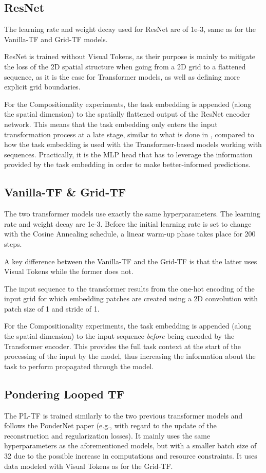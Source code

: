 \subsection{ResNet}
\label{sec:resnet_training_details_appendix}
The learning rate and weight decay used for ResNet are of 1e-3, same as for the Vanilla-TF and Grid-TF models.

ResNet is trained without Visual Tokens, as their purpose is mainly to mitigate the loss of the 2D spatial structure when going from a 2D grid to a flattened sequence, as it is the case for Transformer models, as well as defining more explicit grid boundaries.

For the Compositionality experiments, the task embedding is appended (along the spatial dimension) to the spatially flattened output of the ResNet encoder network. This means that the task embedding only enters the input transformation process at a late stage, similar to what is done in \citep{cvr2022}, compared to how the task embedding is used with the Transformer-based models working with sequences. Practically, it is the MLP head that has to leverage the information provided by the task embedding in order to make better-informed predictions.

\subsection{Vanilla-TF \& Grid-TF} \label{sec:vit_training_details_appendix}
The two transformer models use exactly the same hyperparameters. The learning rate and weight decay are 1e-3. Before the initial learning rate is set to change with the Cosine Annealing schedule, a linear warm-up phase takes place for 200 steps.

A key difference between the Vanilla-TF and the Grid-TF is that the latter uses Visual Tokens while the former does not.

The input sequence to the transformer results from the one-hot encoding of the input grid for which embedding patches are created using a 2D convolution with patch size of 1 and stride of 1.

For the Compositionality experiments, the task embedding is appended (along the spatial dimension) to the input sequence \textit{before} being encoded by the Transformer encoder. This provides the full task context at the start of the processing of the input by the model, thus increasing the information about the task to perform propagated through the model.


\subsection{Pondering Looped TF} \label{sec:pl-tf_training_details_appendix}
The PL-TF is trained similarly to the two previous transformer models and follows the PonderNet paper (e.g., with regard to the update of the reconstruction and regularization losses). It mainly uses the same hyperparameters as the aforementioned models, but with a smaller batch size of 32 due to the possible increase in computations and resource constraints. It uses data modeled with Visual Tokens as for the Grid-TF.



